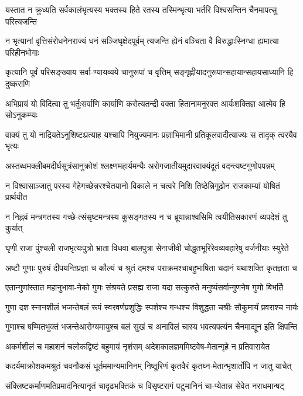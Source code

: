 \twolineshloka
{यस्तात न क्रुध्यति सर्वकालंभृत्यस्य भक्तस्य हिते रतस्य}
{तस्मिन्भृत्या भर्तरि विश्वसन्तिन चैनमापत्सु परित्यजन्ति}


\twolineshloka
{न भृत्यानां वृत्तिसंरोधनेनराज्यं धनं सञ्जिघृक्षेदपूर्वम्}
{त्यजन्ति ह्येनं वञ्चिता वै विरुद्धाःस्निग्धा ह्यमात्या परिहीनभोगाः}


\twolineshloka
{कृत्यानि पूर्वं परिसङ्ख्याय सर्वा-ण्यायव्यये चानुरूपां च वृत्तिम्}
{सङ्गृह्णीयादनुरूपान्सहायान्सहायसाध्यानि हि दुष्कराणि}


\twolineshloka
{अभिप्रायं यो विदित्वा तु भर्तुःसर्वाणि कार्याणि करोत्यतन्द्री}
{वक्ता हितानामनुरक्त आर्यःशक्तिज्ञ आत्मेव हि सोऽनुकम्प्यः}


\twolineshloka
{वाक्यं तु यो नाद्रियतेऽनुशिष्टःप्रत्याह यश्चापि नियुज्यमानः}
{प्रज्ञाभिमानी प्रतिकूलवादीत्याज्यः स तादृक् त्वरयैव भृत्यः}


\twolineshloka
{अस्तब्धमक्लीबमदीर्घसूत्रंसानुक्रोशं श्लक्ष्णमहार्यमन्यैः}
{अरोगजातीयमुदारवाक्यंदूतं वदन्त्यष्टगुणोपपन्नम्}


\twolineshloka
{न विश्वासाञ्जातु परस्य गेहेगच्छेन्नरश्चेतयानो विकाले}
{न चत्वरे निशि तिष्ठेन्निगूढोन राजकाम्यां योषितं प्रार्थयीत}


\twolineshloka
{न निह्नवं मन्त्रगतस्य गच्छे-त्संसृष्टमन्त्रस्य कुसङ्गतस्य}
{न च ब्रूयान्नाश्वसिमि त्वयीतिसकारणं व्यपदेशं तु कुर्यात्}


\twolineshloka
{घृणी राजा पुंश्चली राजभृत्यःपुत्रो भ्राता विधवा बालपुत्रा}
{सेनाजीवी चोद्धृतभूरिरेवव्यवहारेषु वर्जनीयाः स्युरेते}


\twolineshloka
{अष्टौ गुणाः पुरुषं दीपयन्तिप्रज्ञा च कौल्यं च श्रुतं दमश्च}
{पराक्रमश्चाबहुभाषिता चदानं यथाशक्ति कृतज्ञता च}


\twolineshloka
{एतान्गुणांस्तात महानुभावा-नेको गुणः संश्रयते प्रसह्य}
{राजा यदा सत्कुरुते मनुष्यंसर्वान्गुणनेष गुणो बिभर्ति}


\twolineshloka
{गुणा दश स्नानशीलं भजन्तेबलं रूपं स्वरवर्णप्रशुद्धिः}
{स्पर्शश्च गन्धश्च विशुद्धता चश्रीः सौकुमार्यं प्रवराश्च नार्यः}


\twolineshloka
{गुणाश्च षण्मितभुक्तं भजन्तेआरोग्यमायुश्च बलं सुखं च}
{अनाविलं चास्य भवत्यपत्यंन चैनमाद्यून इति क्षिपन्ति}


\twolineshloka
{अकर्मशीलं च महाशनं चलोकद्विष्टं बहुमायं नृशंसम्}
{अदेशकालज्ञममिष्टवेष-मेतान्गृहे न प्रतिवासयेत}


\twolineshloka
{कदर्यमाक्रोशकमश्रुतं चवनौकसं धूर्तममान्यमानिनम्}
{निष्ठूरिणं कृतवैरं कृतघ्न-मेतान्भृशार्तोपि न जातु याचेत्}


\twolineshloka
{संक्लिष्टकर्माणमतिप्रमादंनित्यानृतं चादृढभक्तिकं च}
{विसृष्टरागं पटुमानिनं चा-प्येतान्न सेवेत नराधमान्षट्}


